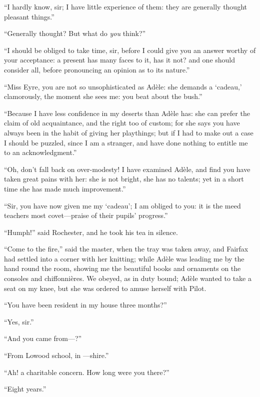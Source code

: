 \enquote{I hardly know, sir; I have little experience of them: they are
generally thought pleasant things.}

\enquote{Generally thought? But what do \emph{you} think?}

\enquote{I should be obliged to take time, sir, before I could give you
an answer worthy of your acceptance: a present has many faces to it, has
it not? and one should consider all, before pronouncing an opinion as to
its nature.}

\enquote{Miss Eyre, you are not so unsophisticated as Adèle: she demands
a \foreignquote{french}{cadeau,} clamorously, the moment she sees me: you beat about
the bush.}

\enquote{Because I have less confidence in my deserts than Adèle has:
she can prefer the claim of old acquaintance, and the right too of
custom; for she says you have always been in the habit of giving her
playthings; but if I had to make out a case I should be puzzled, since I
am a stranger, and have done nothing to entitle me to an
acknowledgment.}

\enquote{Oh, don't fall back on over-modesty! I have examined Adèle,
and find you have taken great pains with her: she is not bright, she has
no talents; yet in a short time she has made much improvement.}

\enquote{Sir, you have now given me my \foreignquote{french}{cadeau}; I am obliged
to you: it is the meed teachers most covet---praise of their pupils'
progress.}

\enquote{Humph!} said \Mr{} Rochester, and he took his tea in silence.

\enquote{Come to the fire,} said the master, when the tray was taken
away, and \Mrs{} Fairfax had settled into a corner with her knitting;
while Adèle was leading me by the hand round the room, showing me the
beautiful books and ornaments on the consoles and chiffonnières. We
obeyed, as in duty bound; Adèle wanted to take a seat on my knee, but
she was ordered to amuse herself with Pilot.

\enquote{You have been resident in my house three months?}

\enquote{Yes, sir.}

\enquote{And you came from---?}

\enquote{From Lowood school, in ---shire.}

\enquote{Ah! a charitable concern. How long were you there?}

\enquote{Eight years.}

